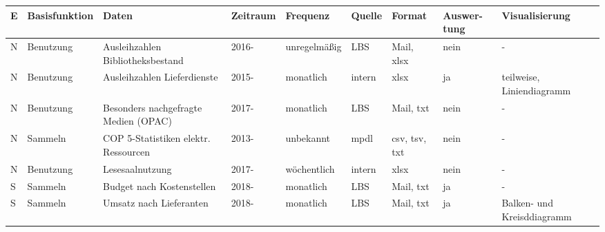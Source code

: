 \begin{table}[H]
    \centering
    \large
    \begin{adjustbox}{max width=\textwidth}
    \begin{tabular}{p{}p{}p{}p{}p{}p{}p{}p{}p{}}
       \toprule
       \textbf{E\footnotemark} &\textbf{Basisfunktion}               &\textbf{Daten}                                 &\textbf{Zeitraum} &\textbf{Frequenz}    &\textbf{Quelle}  &\textbf{Format}          &\textbf{Auswer-tung} & \textbf{Visualisierung}\\
       \midrule     
            N         &Benutzung                      & Ausleihzahlen Bibliotheksbestand              & 2016-             & unregelmäßig         & LBS          & Mail, xlsx                & nein  & -\\
            N         &Benutzung                      & Ausleihzahlen Lieferdienste                   & 2015-             & monatlich         & intern       & xlsx                      & ja    & teilweise, Liniendiagramm\\ 
            N         &Benutzung                      & Besonders nachgefragte Medien (OPAC)          & 2017-             & monatlich         & LBS          & Mail, txt                 & nein  & -\\ 
            N         &Sammeln                       &\acrshort{COP 5}-Statistiken elektr. Ressourcen& 2013-            & unbekannt                 & mpdl         & csv, tsv, txt             & nein  & -\\ 
            N         &Benutzung                      & Lesesaalnutzung                               & 2017-             & wöchentlich       & intern       & xlsx                      & nein  & -\\ 
            S         &Sammeln                       & Budget nach Kostenstellen                   & 2018-               & monatlich         & LBS          & Mail, txt                 & ja    & -\\ 
            S         &Sammeln                       & Umsatz nach Lieferanten                     & 2018-               & monatlich         & LBS          & Mail, txt                 & ja    & Balken- und Kreisddiagramm\\ 

\end{tabular}
\end{adjustbox}
\end{table}
